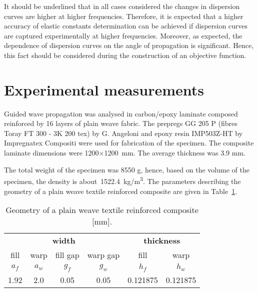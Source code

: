 \documentclass[preprint,12pt]{elsarticle}
\begin{document}
It should be underlined that in all cases considered the changes in dispersion curves are higher at higher frequencies. Therefore, it is expected that a higher accuracy of elastic constants determination can be achieved if dispersion curves are captured experimentally at higher frequencies. Moreover, as expected, the dependence of dispersion curves on the angle of propagation is significant. Hence, this fact should be considered during the construction of an objective function.
\section{Experimental measurements \label{sec:experiment}}
Guided wave propagation was analysed in carbon/epoxy laminate composed reinforced by 16 layers of plain weave fabric. The prepregs GG 205  P (fibres Toray FT 300 - 3K 200 tex) by G. Angeloni and epoxy resin IMP503Z-HT by Impregnatex Compositi were used for fabrication of the specimen. The composite laminate dimensions were 1200$\times$1200~mm. The average thickness was 3.9 mm. 

The total weight of the specimen was 8550 g, hence, based on the volume of the specimen, the density is about~1522.4~kg/m\textsuperscript{3}.
The parameters describing the geometry of a plain weave textile reinforced composite are given in Table~\ref{tab:weave_geo}. 
 \begin{table}[h]
	\renewcommand{\arraystretch}{1.3}
	\centering \footnotesize
	\caption{Geometry of a plain weave textile reinforced composite [mm].}
	\begin{tabular}{cccccc} 
		\toprule
		\multicolumn{4}{c}{\textbf{width} }	& \multicolumn{2}{c}{\textbf{thickness} }  \\ 
	    \cmidrule(lr){1-4} \cmidrule(lr){5-6} 
		fill & warp & fill gap& warp gap& fill & warp\\
		$a_f$ &$a_w$& $g_f$  & $g_w$  & $h_f$& $h_w$ \\ 
		\cmidrule(lr){1-2} \cmidrule(lr){3-4} \cmidrule(lr){5-6}
		1.92 &2.0& 0.05& 0.05 & 0.121875 & 0.121875 \\
		\bottomrule 
	\end{tabular} 
	\label{tab:weave_geo}
\end{table}
\end{document}
